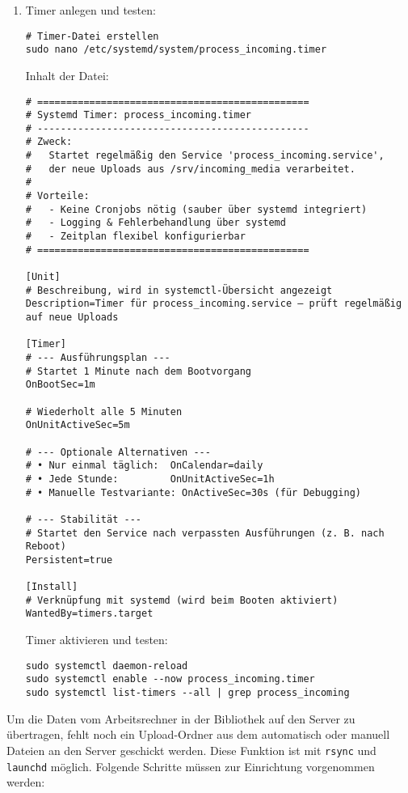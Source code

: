 \documentclass[12pt,a4paper]{report}
\begin{document}
\begin{enumerate}
    \item Timer anlegen und testen:
    \begin{verbatim}
# Timer-Datei erstellen
sudo nano /etc/systemd/system/process_incoming.timer
    \end{verbatim}

    \noindent Inhalt der Datei:
    \begin{verbatim}
# ===============================================
# Systemd Timer: process_incoming.timer
# -----------------------------------------------
# Zweck:
#   Startet regelmäßig den Service 'process_incoming.service',
#   der neue Uploads aus /srv/incoming_media verarbeitet.
#
# Vorteile:
#   - Keine Cronjobs nötig (sauber über systemd integriert)
#   - Logging & Fehlerbehandlung über systemd
#   - Zeitplan flexibel konfigurierbar
# ===============================================

[Unit]
# Beschreibung, wird in systemctl-Übersicht angezeigt
Description=Timer für process_incoming.service – prüft regelmäßig auf neue Uploads

[Timer]
# --- Ausführungsplan ---
# Startet 1 Minute nach dem Bootvorgang
OnBootSec=1m

# Wiederholt alle 5 Minuten
OnUnitActiveSec=5m

# --- Optionale Alternativen ---
# • Nur einmal täglich:  OnCalendar=daily
# • Jede Stunde:         OnUnitActiveSec=1h
# • Manuelle Testvariante: OnActiveSec=30s (für Debugging)

# --- Stabilität ---
# Startet den Service nach verpassten Ausführungen (z. B. nach Reboot)
Persistent=true

[Install]
# Verknüpfung mit systemd (wird beim Booten aktiviert)
WantedBy=timers.target
    \end{verbatim}

    \noindent Timer aktivieren und testen:
    \begin{verbatim}
sudo systemctl daemon-reload
sudo systemctl enable --now process_incoming.timer
sudo systemctl list-timers --all | grep process_incoming
    \end{verbatim}
  \end{enumerate}

  Um die Daten vom Arbeitsrechner in der Bibliothek auf den Server zu übertragen,
  fehlt noch ein Upload-Ordner aus dem automatisch oder manuell Dateien an den Server geschickt werden.
  Diese Funktion ist mit \texttt{rsync} und \texttt{launchd} möglich. 
  Folgende Schritte müssen zur Einrichtung vorgenommen werden:
\end{document}
